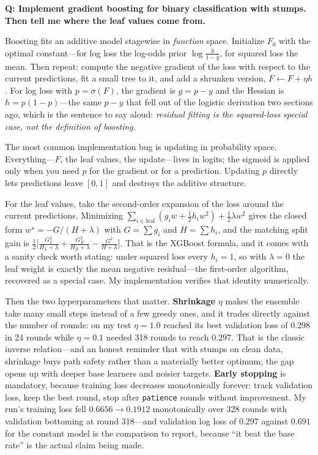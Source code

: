 \begin{interviewq}
\textbf{Q: Implement gradient boosting for binary classification with stumps. Then tell me where the leaf values come from.}

 \quad {} \quad \badgefreq{\freqmed}

\stronganswer

Boosting fits an additive model stagewise in \emph{function} space. Initialize $F_0$ with the optimal constant---for log loss the log-odds prior $\log\frac{\bar y}{1 - \bar y}$, for squared loss the mean. Then repeat: compute the negative gradient of the loss with respect to the current predictions, fit a small tree to it, and add a shrunken version, $F \leftarrow F + \eta h$. For log loss with $p = \sigma(F)$, the gradient is $g = p - y$ and the Hessian is $h = p(1-p)$---the same $p - y$ that fell out of the logistic derivation two sections ago, which is the sentence to say aloud: \emph{residual fitting is the squared-loss special case, not the definition of boosting.}

The most common implementation bug is updating in probability space. Everything---$F$, the leaf values, the update---lives in logits; the sigmoid is applied only when you need $p$ for the gradient or for a prediction. Updating $p$ directly lets predictions leave $[0,1]$ and destroys the additive structure.

For the leaf values, take the second-order expansion of the loss around the current predictions. Minimizing $\sum_{i \in \text{leaf}} (g_i w + \tfrac12 h_i w^2) + \tfrac12 \lambda w^2$ gives the closed form $w^\star = -G/(H + \lambda)$ with $G = \sum g_i$ and $H = \sum h_i$, and the matching split gain is $\tfrac12\big[\frac{G_L^2}{H_L + \lambda} + \frac{G_R^2}{H_R + \lambda} - \frac{G^2}{H + \lambda}\big]$. That is the XGBoost formula, and it comes with a sanity check worth stating: under squared loss every $h_i = 1$, so with $\lambda = 0$ the leaf weight is exactly the mean negative residual---the first-order algorithm, recovered as a special case. My implementation verifies that identity numerically.

Then the two hyperparameters that matter. \textbf{Shrinkage} $\eta$ makes the ensemble take many small steps instead of a few greedy ones, and it trades directly against the number of rounds: on my test $\eta = 1.0$ reached its best validation loss of $0.298$ in 24 rounds while $\eta = 0.1$ needed 318 rounds to reach $0.297$. That is the classic inverse relation---and an honest reminder that with stumps on clean data, shrinkage buys path safety rather than a materially better optimum; the gap opens up with deeper base learners and noisier targets. \textbf{Early stopping} is mandatory, because training loss decreases monotonically forever: track validation loss, keep the best round, stop after \texttt{patience} rounds without improvement. My run's training loss fell $0.6656 \to 0.1912$ monotonically over 328 rounds with validation bottoming at round 318---and validation log loss of $0.297$ against $0.691$ for the constant model is the comparison to report, because ``it beat the base rate'' is the actual claim being made.


\end{interviewq}
